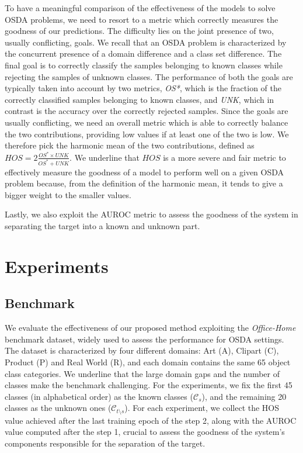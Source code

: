 \documentclass[10pt,twocolumn,letterpaper]{article}
\begin{document}
To have a meaningful comparison of the effectiveness
of the models to solve OSDA problems, we need to resort to a metric which
correctly measures the goodness of our predictions.
The difficulty lies on the joint presence of two, usually conflicting, goals.
We recall that an OSDA problem is characterized by the concurrent presence of
a domain difference and a class set difference.
The final goal is to correctly classify the samples belonging to known classes
while rejecting the samples of unknown classes.
The performance of both the goals are typically taken into account by two metrics, {\it OS*},
which is the fraction of the correctly classified samples belonging to known classes, and {\it UNK},
which in contrast is the accuracy over the correctly rejected samples.
Since the goals are usually conflicting, we need an overall metric which is able to correctly balance
the two contributions, providing low values if at least one of the two is low.
We therefore pick the harmonic mean of the two contributions, defined as $HOS = 2\frac{OS^*\times UNK}{OS^*+UNK}$.
We underline that $HOS$ is a more severe and fair metric to effectively measure the goodness of a model to perform well
on a given OSDA problem because, from the definition of the harmonic mean, it tends to give a bigger weight to the smaller values.

Lastly, we also exploit the AUROC metric to assess the goodness of the system in separating
the target into a known and unknown part.

\section{Experiments}
\label{sec:experiments}

\subsection{Benchmark}
\label{sec:dataset}

We evaluate the effectiveness of our proposed method exploiting the {\it Office-Home} \cite{OfficeHomeDataset} benchmark dataset,
widely used to assess the performance for OSDA settings.
The dataset is characterized by four different domains: Art (A), Clipart (C), Product (P) and Real World (R), and
each domain contains the same 65 object class categories.
We underline that the large domain gaps and the number of classes make the benchmark challenging.
For the experiments, we fix the first 45 classes (in alphabetical order) as the known classes ($\mathcal{C}_s$),
and the remaining 20 classes as the unknown ones ($\mathcal{C}_{t \setminus s}$).
For each experiment, we collect the HOS value achieved after the last training epoch of the step 2,
along with the AUROC value computed after the step 1, crucial to assess the goodness
of the system's components responsible for the separation of the target.
\end{document}
